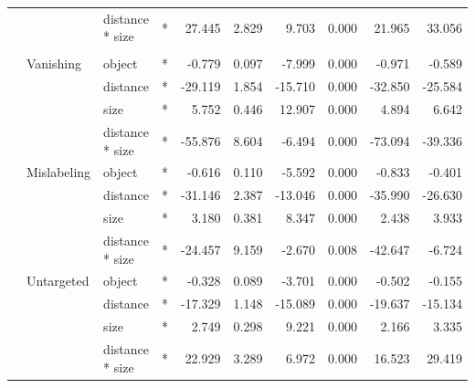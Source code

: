 \documentclass[
]{article}
\begin{document}
\begin{longtable}[t]{llllrrrrrr}
\cmidrule{3-10}\nopagebreak
\hspace{1em} &  & distance * size & * & 27.445 & 2.829 & 9.703 & 0.000 & 21.965 & 33.056\\
\cmidrule{1-10}\pagebreak[0]
\addlinespace[0.3em]
\multicolumn{10}{l}{\textbf{Cascade R-CNN}}\\
\hspace{1em} & Vanishing & object & * & -0.779 & 0.097 & -7.999 & 0.000 & -0.971 & -0.589\\
\cmidrule{3-10}\nopagebreak
\hspace{1em} &  & distance & * & -29.119 & 1.854 & -15.710 & 0.000 & -32.850 & -25.584\\
\cmidrule{3-10}\nopagebreak
\hspace{1em} &  & size & * & 5.752 & 0.446 & 12.907 & 0.000 & 4.894 & 6.642\\
\cmidrule{3-10}\nopagebreak
\hspace{1em} &  & distance * size & * & -55.876 & 8.604 & -6.494 & 0.000 & -73.094 & -39.336\\
\cmidrule{2-10}\nopagebreak
\hspace{1em} & Mislabeling & object & * & -0.616 & 0.110 & -5.592 & 0.000 & -0.833 & -0.401\\
\cmidrule{3-10}\nopagebreak
\hspace{1em} &  & distance & * & -31.146 & 2.387 & -13.046 & 0.000 & -35.990 & -26.630\\
\cmidrule{3-10}\nopagebreak
\hspace{1em} &  & size & * & 3.180 & 0.381 & 8.347 & 0.000 & 2.438 & 3.933\\
\cmidrule{3-10}\nopagebreak
\hspace{1em} &  & distance * size & * & -24.457 & 9.159 & -2.670 & 0.008 & -42.647 & -6.724\\
\cmidrule{2-10}\nopagebreak
\hspace{1em} & Untargeted & object & * & -0.328 & 0.089 & -3.701 & 0.000 & -0.502 & -0.155\\
\cmidrule{3-10}\nopagebreak
\hspace{1em} &  & distance & * & -17.329 & 1.148 & -15.089 & 0.000 & -19.637 & -15.134\\
\cmidrule{3-10}\nopagebreak
\hspace{1em} &  & size & * & 2.749 & 0.298 & 9.221 & 0.000 & 2.166 & 3.335\\
\cmidrule{3-10}\nopagebreak
\hspace{1em} &  & distance * size & * & 22.929 & 3.289 & 6.972 & 0.000 & 16.523 & 29.419\\
\bottomrule
\end{longtable}
\endgroup{}
\end{document}
